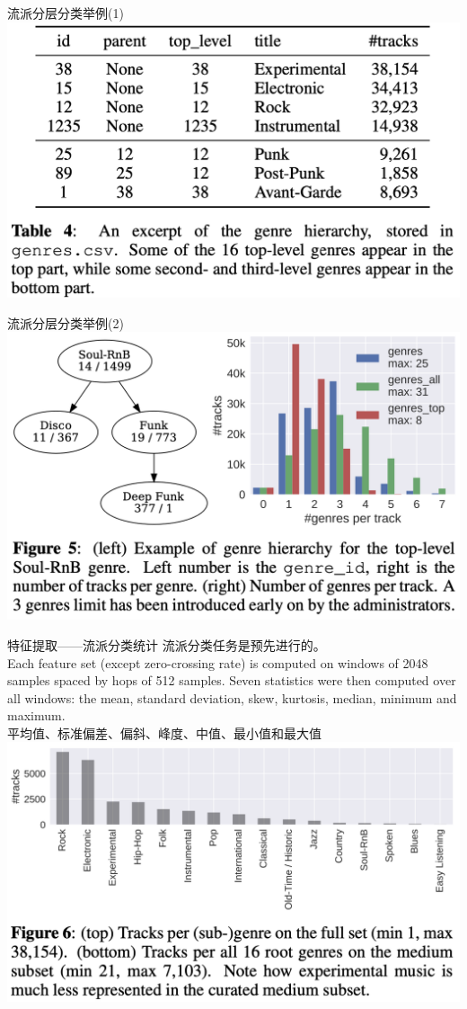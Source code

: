 \documentclass{beamer}
\begin{document}
\begin{frame}{流派分层分类举例(1)}
	\includegraphics[width=\linewidth]{Assets/表4}
\end{frame}

\begin{frame}{流派分层分类举例(2)}
	\includegraphics[width=\linewidth]{Assets/图5}
\end{frame}

\begin{frame}{特征提取——流派分类统计}
	流派分类任务是预先进行的。\\
	Each feature set (except zero-crossing rate) is computed on windows of 2048 samples spaced by hops of 512 samples. Seven statistics were then computed over all windows: the mean, standard deviation, skew, kurtosis, median, minimum and maximum.\\
	平均值、标准偏差、偏斜、峰度、中值、最小值和最大值
	\includegraphics[width=0.8\linewidth]{Assets/图6}
\end{frame}
\end{document}

